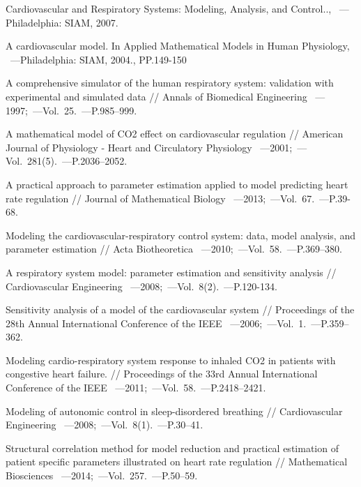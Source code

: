 \begin{thebibliography}{}
     Cardiovascular and Respiratory Systems: Modeling, Analysis, and
Control.., ~---Philadelphia:  SIAM, 2007.

    A cardiovascular model. In Applied Mathematical Models in Human Physiology, ~---Philadelphia:  SIAM, 2004., PP.149-150
   
    A comprehensive simulator of the human respiratory system: validation with
experimental and simulated data // Annals of Biomedical Engineering ~---1997;~---Vol.~25.~---P.985–999.

     A mathematical model of CO2 effect on cardiovascular regulation // American Journal of
Physiology - Heart and Circulatory Physiology ~---2001;~---Vol.~281(5).~---P.2036–2052.

     A practical approach to parameter estimation applied to model predicting heart rate
regulation // Journal of Mathematical Biology ~---2013;~---Vol.~67.~---P.39-68.

     Modeling the cardiovascular-respiratory control system: data, model analysis, and parameter
estimation // Acta Biotheoretica ~---2010;~---Vol.~58.~---P.369–380.

     A respiratory system model: parameter estimation and sensitivity analysis // Cardiovascular
Engineering ~---2008;~---Vol.~8(2).~---P.120-134.

     Sensitivity analysis of a model of the cardiovascular system // Proceedings of the 28th Annual
International Conference of the IEEE ~---2006;~---Vol.~1.~---P.359–362.

     Modeling cardio-respiratory system response to inhaled CO2 in patients with
congestive heart failure. // Proceedings of the 33rd Annual International Conference of the IEEE ~---2011;~---Vol.~58.~---P.2418–2421.

     Modeling of autonomic control in sleep-disordered breathing // Cardiovascular Engineering ~---2008;~---Vol.~8(1).~---P.30–41.
    
     Structural correlation method for model reduction and practical estimation of
patient specific parameters illustrated on heart rate regulation // Mathematical Biosciences ~---2014;~---Vol.~257.~---P.50–59.


\end{thebibliography}
